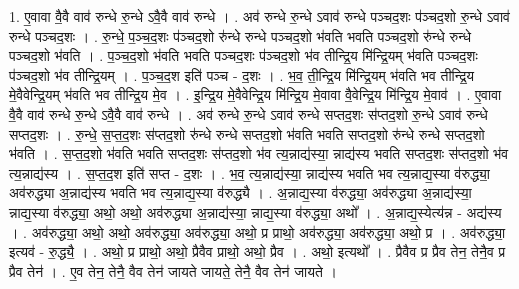 \documentclass[17pt]{extarticle}
\begin{document}
1. ए॒वावा वै॒वै वाव॑ रुन्धे रु॒न्धे ऽवै॒वै वाव॑ रुन्धे । . अव॑ रुन्धे रु॒न्धे ऽवाव॑ रुन्धे पञ्चद॒शः प॑ञ्चद॒शो रु॒न्धे ऽवाव॑ रुन्धे पञ्चद॒शः । . रु॒न्धे॒ प॒ञ्च॒द॒शः प॑ञ्चद॒शो रु॑न्धे रुन्धे पञ्चद॒शो भ॑वति भवति पञ्चद॒शो रु॑न्धे रुन्धे पञ्चद॒शो भ॑वति । . प॒ञ्च॒द॒शो भ॑वति भवति पञ्चद॒शः प॑ञ्चद॒शो भ॑व तीन्द्रि॒य मि॑न्द्रि॒यम् भ॑वति पञ्चद॒शः प॑ञ्चद॒शो भ॑व तीन्द्रि॒यम् । . प॒ञ्च॒द॒श इति॑ पञ्च - द॒शः । . भ॒व॒ ती॒न्द्रि॒य मि॑न्द्रि॒यम् भ॑वति भव तीन्द्रि॒य मे॒वैवेन्द्रि॒यम् भ॑वति भव तीन्द्रि॒य मे॒व । . इ॒न्द्रि॒य मे॒वैवेन्द्रि॒य मि॑न्द्रि॒य मे॒वावा वै॒वेन्द्रि॒य मि॑न्द्रि॒य मे॒वाव॑ । . ए॒वावा वै॒वै वाव॑ रुन्धे रु॒न्धे ऽवै॒वै वाव॑ रुन्धे । . अव॑ रुन्धे रु॒न्धे ऽवाव॑ रुन्धे सप्तद॒शः स॑प्तद॒शो रु॒न्धे ऽवाव॑ रुन्धे सप्तद॒शः । . रु॒न्धे॒ स॒प्त॒द॒शः स॑प्तद॒शो रु॑न्धे रुन्धे सप्तद॒शो भ॑वति भवति सप्तद॒शो रु॑न्धे रुन्धे सप्तद॒शो भ॑वति । . स॒प्त॒द॒शो भ॑वति भवति सप्तद॒शः स॑प्तद॒शो भ॑व त्य॒न्नाद्य॑स्या॒ न्नाद्य॑स्य भवति सप्तद॒शः स॑प्तद॒शो भ॑व त्य॒न्नाद्य॑स्य । . स॒प्त॒द॒श इति॑ सप्त - द॒शः । . भ॒व॒ त्य॒न्नाद्य॑स्या॒ न्नाद्य॑स्य भवति भव त्य॒न्नाद्य॒स्या व॑रुद्ध्या॒ अव॑रुद्ध्या अ॒न्नाद्य॑स्य भवति भव त्य॒न्नाद्य॒स्या व॑रुद्ध्यै । . अ॒न्नाद्य॒स्या व॑रुद्ध्या॒ अव॑रुद्ध्या अ॒न्नाद्य॑स्या॒ न्नाद्य॒स्या व॑रुद्ध्या॒ अथो॒ अथो॒ अव॑रुद्ध्या 
अ॒न्नाद्य॑स्या॒ न्नाद्य॒स्या व॑रुद्ध्या॒ अथो᳚ । . अ॒न्नाद्य॒स्येत्य॑न्न - अद्य॑स्य । . अव॑रुद्ध्या॒ अथो॒ अथो॒ अव॑रुद्ध्या॒ अव॑रुद्ध्या॒ अथो॒ प्र प्राथो॒ अव॑रुद्ध्या॒ अव॑रुद्ध्या॒ अथो॒ प्र । . अव॑रुद्ध्या॒ इत्यव॑ - रु॒द्ध्यै॒ । . अथो॒ प्र प्राथो॒ अथो॒ प्रैवैव प्राथो॒ अथो॒ प्रैव । . अथो॒ इत्यथो᳚ । . प्रैवैव प्र प्रैव तेन॒ तेनै॒व प्र प्रैव तेन॑ । . ए॒व तेन॒ तेनै॒ वैव तेन॑ जायते जायते॒ तेनै॒ वैव तेन॑ जायते । \newline
\end{document}
